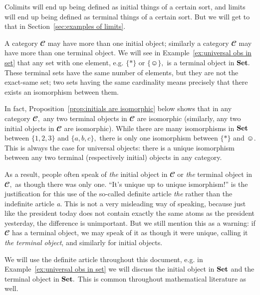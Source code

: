 \documentclass[../main/CT4S-EN-RU]{subfiles}
\begin{document}
\begin{blockENG}
Colimits will end up being defined as initial things of a certain sort, and limits will end up being defined as terminal things of a certain sort. But we will get to that in Section~\ref{sec:examples of limits}.
\end{blockENG}

\begin{blockRUS}
\end{blockRUS}

\begin{warningENG}
A category ${𝓒}$ may have more than one initial object; similarly a category ${𝓒}$ may have more than one terminal object. We will see in Example~\ref{ex:universal obs in set} that any set with one element, e.g. $\{*\}$ or ${\{☺\}},$ is a terminal object in ${\mathbf{Set}}.$ These terminal sets have the same number of elements, but they are not the exact-same set; two sets having the same cardinality means precisely that there exists an isomorphism between them.

In fact, Proposition~\ref{prop:initials are isomorphic} below shows that in any category ${𝓒},$ any two terminal objects in ${𝓒}$ are isomorphic (similarly, any two initial objects in ${𝓒}$ are isomorphic). While there are many isomorphisms in ${\mathbf{Set}}$ between $\{1,2,3\}$ and $\{a,b,c\},$ there is only one isomorphism between $\{*\}$ and ${☺}.$ This is always the case for universal objects: there is a unique isomorphism between any two terminal (respectively initial) objects in any category.

As a result, people often speak of {\em the} initial object in ${𝓒}$ or {\em the} terminal object in ${𝓒},$ as though there was only one. “It's unique up to unique ismorphism!” is the justification for this use of the so-called definite article {\em the} rather than the indefinite article {\em a}. This is not a very misleading way of speaking, because just like the president today does not contain exactly the same atoms as the president yesterday, the difference is unimportant. But we still mention this as a warning: if ${𝓒}$ has a terminal object, we may speak of it as though it were unique, calling it {\em the terminal object}, and similarly for initial objects.

We will use the definite article throughout this document, e.g. in Example~\ref{ex:universal obs in set} we will discuss the initial object in ${\mathbf{Set}}$ and the terminal object in ${\mathbf{Set}}.$ This is common throughout mathematical literature as well.
\end{warningENG}
\end{document}
